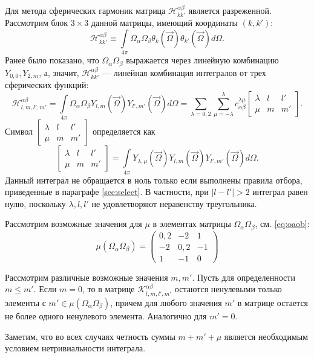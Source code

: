 Для метода сферических гармоник матрица $\mathscr{H}_{kk'}^{\alpha\beta}$ является разреженной. Рассмотрим блок $3\times 3$ данной матрицы, имеющий координаты $(k,k')$:
\[
\mathscr{H}_{kk'}^{\alpha\beta} \equiv \int\limits_{4\pi} \Omega_\alpha\Omega_\beta \theta_{k}(\vec \Omega) \theta_{k'}(\vec \Omega) d\Omega.
\]
Ранее было показано, что $ \Omega_\alpha\Omega_\beta$ выражается через линейную комбинацию $Y_{0,0}, Y_{2,m}$, а, значит, $\mathscr{H}_{kk'}^{\alpha\beta}$ --- линейная комбинация интегралов от трех сферических функций:
\[
\mathscr{H}_{l,m,l',m'}^{\alpha\beta} = 
\int\limits_{4\pi} \Omega_\alpha\Omega_\beta Y_{l,m}(\vec \Omega) Y_{l',m'}(\vec \Omega) d\Omega = 
\sum_{\lambda = 0,2}\sum_{\mu = -\lambda}^{\lambda} c_{\alpha\beta}^{\lambda\mu} \begin{bmatrix}
\lambda & l & l'\\
\mu & m & m'
\end{bmatrix}.
\]
Символ $\begin{bmatrix}
\lambda & l & l'\\
\mu & m & m'
\end{bmatrix}$ определяется как
\[
\begin{bmatrix}
\lambda & l & l'\\
\mu & m & m'
\end{bmatrix} = \int\limits_{4\pi} 
Y_{\lambda,\mu}(\vec \Omega)
Y_{l,m}(\vec \Omega)
Y_{l',m'}(\vec \Omega) d\Omega.
\]
Данный интеграл не обращается в ноль только если выполнены правила отбора, приведенные в параграфе \ref{sec:select}. В частности, при $|l - l'| > 2$ интеграл равен нулю, поскольку $\lambda, l, l'$ не удовлетворяют неравенству треугольника.

Рассмотрим возможные значения для $\mu$ в элементах матрицы $\Omega_\alpha\Omega_\beta$, см. \eqref{eq:oaob}:
\[
\mu(\Omega_\alpha\Omega_\beta) = \begin{pmatrix}
0,2& -2 & 1\\
-2 & 0,2 & -1\\
1 & -1 & 0
\end{pmatrix}
\]

Рассмотрим различные возможные значения $m, m'$. Пусть для определенности $m \leq m'$. Если $m = 0$, то в матрице $\mathscr{K}_{l,m,l',m'}^{\alpha\beta}$ остаются ненулевыми только элементы с 
$m' \in \mu(\Omega_\alpha\Omega_\beta)$, причем для любого значения $m'$ в матрице остается не более одного ненулевого элемента. Аналогично для $m' = 0$.

Заметим, что во всех случаях четность суммы $m + m' + \mu$ является необходимым условием нетривиальности интеграла.

